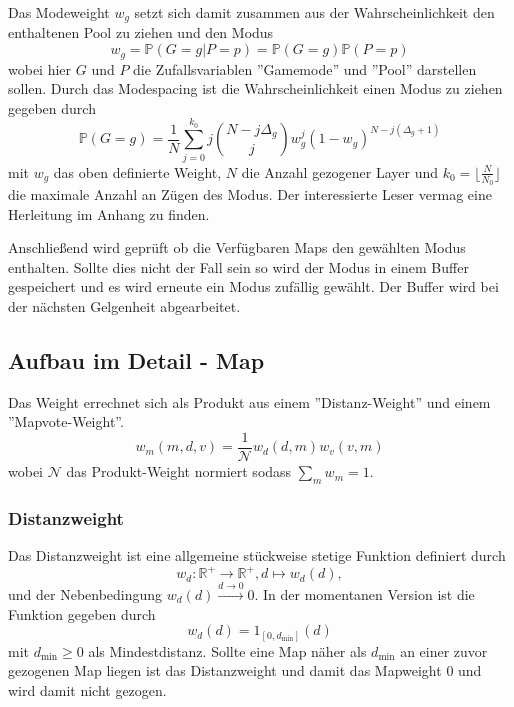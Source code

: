         Das Modeweight $w_g$ setzt sich damit zusammen aus der Wahrscheinlichkeit den enthaltenen Pool zu ziehen und den Modus 
        \begin{equation}
            w_g = \mathbb{P}(G=g|P=p) = \mathbb{P}(G=g)\mathbb{P}(P=p)
        \end{equation}
        wobei hier $G$ und $P$ die Zufallsvariablen ''Gamemode'' und ''Pool'' darstellen sollen.
        Durch das Modespacing ist die Wahrscheinlichkeit einen Modus zu ziehen gegeben durch 
        \begin{equation}
            \mathbb{P}(G=g) = \frac{1}{N}\sum_{j=0}^{k_0}j\binom{N-j \Delta_g}{j}w_g^j(1-w_g)^{N-j(\Delta_g+1)}
        \end{equation}
        mit $w_g$ das oben definierte Weight, $N$ die Anzahl gezogener Layer und $k_0=\lfloor\frac{N}{N_0}\rfloor$ die maximale Anzahl an Zügen des Modus.
        Der interessierte Leser vermag eine Herleitung im Anhang zu finden.

        Anschließend wird geprüft ob die Verfügbaren Maps den gewählten Modus enthalten. Sollte dies nicht der Fall sein so wird der Modus in einem Buffer gespeichert und es wird erneute ein Modus zufällig gewählt. 
        Der Buffer wird bei der nächsten Gelgenheit abgearbeitet.
    \subsection{Aufbau im Detail - Map}
        Das Weight errechnet sich als Produkt aus einem ''Distanz-Weight'' und einem ''Mapvote-Weight''. 
        \begin{equation}
            w_m(m,d,v) = \frac{1}{\mathcal{N}}w_d(d,m)w_v(v,m)
        \end{equation}
        wobei $\mathcal{N}$ das Produkt-Weight normiert sodass $\sum_m w_m = 1$.
        \subsubsection{Distanzweight}
            Das Distanzweight ist eine allgemeine stückweise stetige Funktion definiert durch
            \begin{equation}
                w_d : \mathbb{R}^+ \rightarrow \mathbb{R}^+, d \mapsto w_d(d),
            \end{equation}
            und der Nebenbedingung $w_d(d)\overset{d\rightarrow 0}{\longrightarrow}0$.
            In der momentanen Version ist die Funktion gegeben durch
            \begin{equation}
                w_d(d) = 1_{[0,d_\text{min}]}(d)
            \end{equation}
            mit $d_\text{min}\geq 0$ als Mindestdistanz. 
            Sollte eine Map näher als $d_\text{min}$ an einer zuvor gezogenen Map liegen ist das Distanzweight und damit das Mapweight $0$ und wird damit nicht gezogen. 
